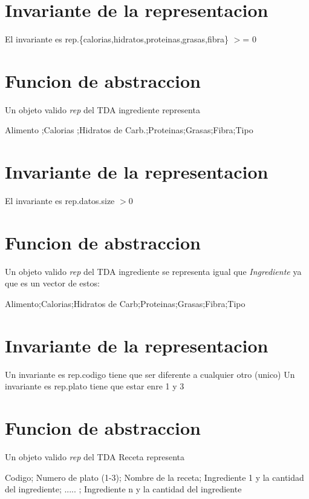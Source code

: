 \hypertarget{repConjunto_invConjunto}{}\section{Invariante de la representacion}\label{repConjunto_invConjunto}
El invariante es rep.\{calorias,hidratos,proteinas,grasas,fibra\} $>$= 0\hypertarget{repConjunto_faConjunto}{}\section{Funcion de abstraccion}\label{repConjunto_faConjunto}
Un objeto valido {\itshape rep} del T\+DA ingrediente representa

Alimento ;Calorias ;Hidratos de Carb.;Proteinas;Grasas;Fibra;Tipo\hypertarget{repConjunto_invConjunto}{}\section{Invariante de la representacion}\label{repConjunto_invConjunto}
El invariante es rep.\+datos.\+size $>$0\hypertarget{repConjunto_faConjunto}{}\section{Funcion de abstraccion}\label{repConjunto_faConjunto}
Un objeto valido {\itshape rep} del T\+DA ingrediente se representa igual que {\itshape Ingrediente} ya que es un vector de estos\+:

Alimento;Calorias;Hidratos de Carb;Proteinas;Grasas;Fibra;Tipo\hypertarget{repConjunto_invConjunto}{}\section{Invariante de la representacion}\label{repConjunto_invConjunto}
Un invariante es rep.\+codigo tiene que ser diferente a cualquier otro (unico) Un invariante es rep.\+plato tiene que estar enre 1 y 3\hypertarget{repConjunto_faConjunto}{}\section{Funcion de abstraccion}\label{repConjunto_faConjunto}
Un objeto valido {\itshape rep} del T\+DA Receta representa

Codigo; Numero de plato (1-\/3); Nombre de la receta; Ingrediente 1 y la cantidad del ingrediente; ..... ; Ingrediente n y la cantidad del ingrediente 
